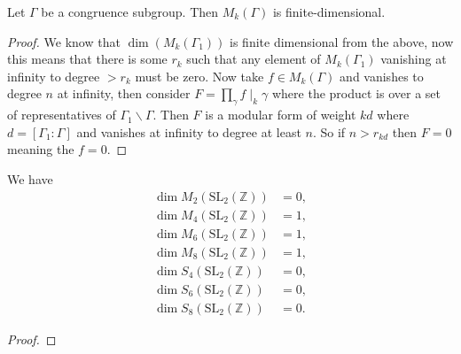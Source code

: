 \begin{theorem}\label{thm:dim-mf}\leanok {}
Let $\Gamma$ be a congruence subgroup. Then $M_k(\Gamma)$ is finite-dimensional.
\end{theorem}
\begin{proof}
We know that $\dim(M_k(\Gamma_1))$ is finite dimensional from the above, now this means that there is some $r_k$ such that any element of $M_k(\Gamma_1)$ vanishing at infinity to degree $> r_k$ must be zero. Now take $f \in M_k(\Gamma)$ and vanishes to degree $n$ at infinity, then consider $F = \prod_\gamma f\mid_k \gamma$ where the product is over a set of representatives of $\Gamma_1 \backslash \Gamma$. Then $F$ is a modular form of weight $k d$ where $d = [\Gamma_1: \Gamma]$ and vanishes at infinity to degree at least $n$. So if $n > r_{kd}$ then $F=0$ meaning the $f=0$.
\end{proof}


\begin{corollary}\label{cor:dim-mf}\leanok
We have
\begin{align}
    \dim M_2(\mathrm{SL}_{2}(\mathbb{Z})) &= 0, \label{eqn:dimM2} \\
    \dim M_4(\mathrm{SL}_{2}(\mathbb{Z})) &= 1, \label{eqn:dimM4} \\
    \dim M_6(\mathrm{SL}_{2}(\mathbb{Z})) &= 1, \label{eqn:dimM6} \\
    \dim M_8(\mathrm{SL}_{2}(\mathbb{Z})) &= 1, \label{eqn:dimM8} \\
    \dim S_4(\mathrm{SL}_{2}(\mathbb{Z})) &= 0, \label{eqn:dimS4} \\
    \dim S_6(\mathrm{SL}_{2}(\mathbb{Z})) &= 0, \label{eqn:dimS6} \\
    \dim S_8(\mathrm{SL}_{2}(\mathbb{Z})) &= 0. \label{eqn:dimS8}
\end{align}
\end{corollary}
\begin{proof}
\leanok
\end{proof}

